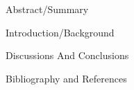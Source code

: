 \documentclass{report}
\begin{document}
\begin{flushleft}
  Abstract/Summary
\end{flushleft}

\begin{flushleft}
  Introduction/Background
\end{flushleft}

\newpage
\begin{flushleft}
Discussions And Conclusions
\end{flushleft}

\begin{flushleft}
  Bibliography and References
\end{flushleft}
\end{document}
